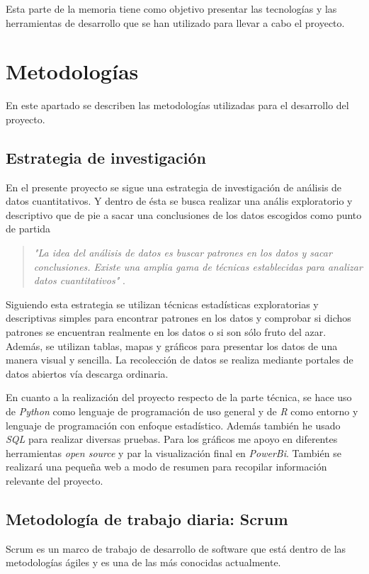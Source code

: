 
Esta parte de la memoria tiene como objetivo presentar las tecnologías y las herramientas de desarrollo que se han utilizado para llevar a cabo el proyecto. 

\section{Metodologías}\label{metodologias}
En este apartado se describen las metodologías utilizadas para el desarrollo del proyecto.

\subsection{Estrategia de investigación}
En el presente proyecto se sigue una estrategia de investigación de análisis de datos cuantitativos. Y dentro de ésta se busca realizar una anális exploratorio y descriptivo que de pie a sacar una conclusiones de los datos escogidos como punto de partida

\begin{quote}
\textit{"La idea del análisis de datos es buscar patrones en los datos y sacar conclusiones. Existe una amplia gama de técnicas establecidas para analizar datos cuantitativos"} \cite{oates_researching_2006}. 
\end{quote}

Siguiendo esta estrategia se utilizan técnicas estadísticas exploratorias y descriptivas simples para encontrar patrones en los datos y comprobar si dichos patrones se encuentran realmente en los datos o si son sólo fruto del azar. Además, se utilizan tablas, mapas y gráficos para presentar los datos de una manera visual y sencilla. La recolección de datos se realiza mediante portales de datos abiertos vía descarga ordinaria. 

En cuanto a la realización del proyecto respecto de la parte técnica, se hace uso de \textit{Python} como lenguaje de programación de uso general y de \textit{R} como entorno y lenguaje de programación con enfoque estadístico. Además también he usado \textit{SQL} para realizar diversas pruebas. Para los gráficos me apoyo en diferentes herramientas \textit{open source} y par la visualización final en \textit{PowerBi}. También se realizará una pequeña web a modo de resumen para recopilar información relevante del proyecto. 

\subsection{Metodología de trabajo diaria: Scrum}\label{metodologias_scrum}
Scrum es un marco de trabajo de desarrollo de software que está dentro de las metodologías ágiles y es una de las más conocidas actualmente. 

